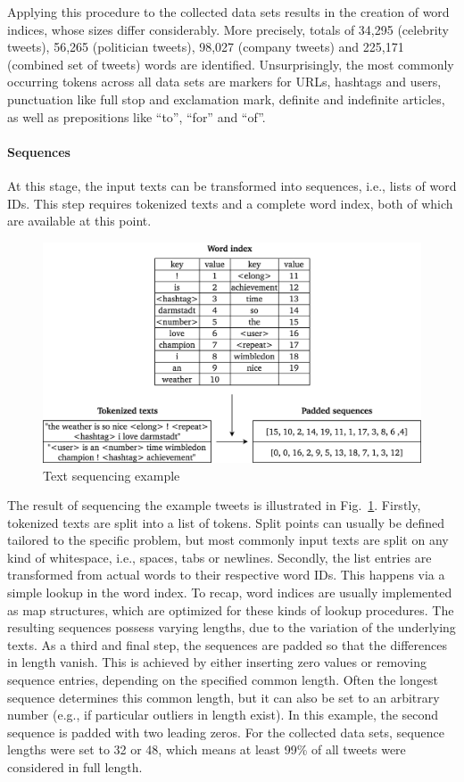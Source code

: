 Applying this procedure to the collected data sets results in the creation of
word indices, whose sizes differ considerably.
More precisely, totals of 34,295 (celebrity tweets), 56,265 (politician tweets),
98,027 (company tweets) and 225,171 (combined set of tweets) words are identified.
Unsurprisingly, the most commonly occurring tokens across all data sets are markers
for URLs, hashtags and users, punctuation like full stop and exclamation mark,
definite and indefinite articles, as well as prepositions like ``to'', ``for''
and ``of''.

\paragraph{Sequences}
\label{sub:sequences}

At this stage, the input texts can be transformed into sequences, i.e., lists
of word IDs.
This step requires tokenized texts and a complete word index, both of which
are available at this point.

\begin{figure}[h]
  \includegraphics[width=\textwidth]{img/text_preprocessing_3}
  \caption{Text sequencing example}
\label{fig:text_sequencing}
\end{figure}

The result of sequencing the example tweets is illustrated in Fig.~\ref{fig:text_sequencing}.
Firstly, tokenized texts are split into a list of tokens.
Split points can usually be defined tailored to the specific problem, but
most commonly input texts are split on any kind of whitespace, i.e., spaces,
tabs or newlines.
Secondly, the list entries are transformed from actual words to their respective
word IDs.
This happens via a simple lookup in the word index.
To recap, word indices are usually implemented as map structures, which are
optimized for these kinds of lookup procedures.
The resulting sequences possess varying lengths, due to the variation of the
underlying texts.
As a third and final step, the sequences are padded so that the differences in
length vanish.
This is achieved by either inserting zero values or removing sequence entries,
depending on the specified common length.
Often the longest sequence determines this common length, but it can also be
set to an arbitrary number (e.g., if particular outliers in length exist).
In this example, the second sequence is padded with two leading zeros.
For the collected data sets, sequence lengths were set to 32 or 48, which
means at least 99\% of all tweets were considered in full length.

